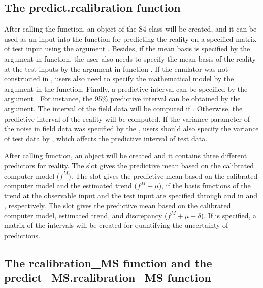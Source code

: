   \subsection{The predict.rcalibration function} 
  
  After calling the  function, an object of the  S4 class will be created, and it can be used as an input into the  function for predicting the reality on a specified matrix of test input using the argument .     Besides, {if the mean basis is specified by the argument     in  function}, the user also needs to specify the mean basis of the reality at the test inputs by the argument  in function . If the emulator was not constructed in  , users also need to specify the mathematical model by the argument  in the  function.
   Finally, a predictive interval can be specified by the argument . For instance, the 95\% predictive interval can be obtained by the   argument. The interval of the field data will be computed  if . Otherwise, the predictive interval of the reality will be computed. 
 If the {variance} parameter of the noise in field data was specified by the , users {should} also specify the variance of test data by , which affects the predictive interval of test data.  
  
  After calling   function, an object   will be created and it  contains three different predictors for reality. The slot  gives the predictive mean based on the calibrated computer model ($f^M$). The slot   gives the predictive mean based on the calibrated computer model and the estimated trend ($f^M+\mu$), if the basis functions of the trend at the observable input and the test input are specified through  and  in  and , respectively. The slot  gives the predictive mean based on the calibrated computer model, estimated trend, and discrepancy  ($f^M+\mu+\delta$). If  is specified, a matrix of the intervals will be created for quantifying the uncertainty of predictions. 
  
  \subsection{The rcalibration\_MS function and the predict\_MS.rcalibration\_MS function}

